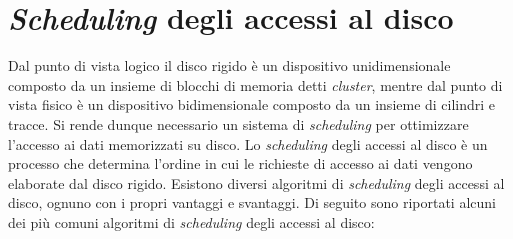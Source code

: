 \section{\textit{Scheduling} degli accessi al disco}
    Dal punto di vista logico il disco rigido è un dispositivo unidimensionale composto da un insieme di blocchi di memoria detti \textit{cluster}, mentre dal punto di vista fisico è un dispositivo bidimensionale composto da un insieme di cilindri e tracce. Si rende dunque necessario un sistema di \textit{scheduling} per ottimizzare l'accesso ai dati memorizzati su disco. Lo \textit{scheduling} degli accessi al disco è un processo che determina l'ordine in cui le richieste di accesso ai dati vengono elaborate dal disco rigido. Esistono diversi algoritmi di \textit{scheduling} degli accessi al disco, ognuno con i propri vantaggi e svantaggi. Di seguito sono riportati alcuni dei più comuni algoritmi di \textit{scheduling} degli accessi al disco:
